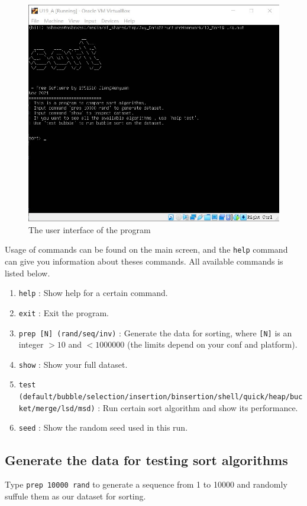 \documentclass[cn,black,12pt,normal]{elegantnote}
\begin{document}
\begin{figure}[H]
    \centering
    \includegraphics[width=0.7\linewidth]{image/sort_01.jpg}
    \caption{The user interface of the program}
\end{figure}

Usage of commands can be found on the main screen, and the \lstinline{help} command can give you information about theses commands.  All available commands is listed below.

\begin{enumerate}
    \item \lstinline{help} : Show help for a certain command.
    \item \lstinline{exit} : Exit the program.
    \item \lstinline{prep [N] (rand/seq/inv)} : Generate the data for sorting, where \lstinline{[N]} is an integer $> 10$ and $< 1000000$ (the limits depend on your conf and platform).
    \item \lstinline{show} : Show your full dataset.
    \item \lstinline{test (default/bubble/selection/insertion/binsertion/shell/quick/heap/bucket/merge/lsd/msd)} : Run certain sort algorithm and show its performance.
    \item \lstinline{seed} : Show the random seed used in this run.
\end{enumerate}

\subsection{Generate the data for testing sort algorithms}

Type \lstinline{prep 10000 rand} to generate a sequence from 1 to 10000 and randomly suffule them as our dataset for sorting.
\end{document}
